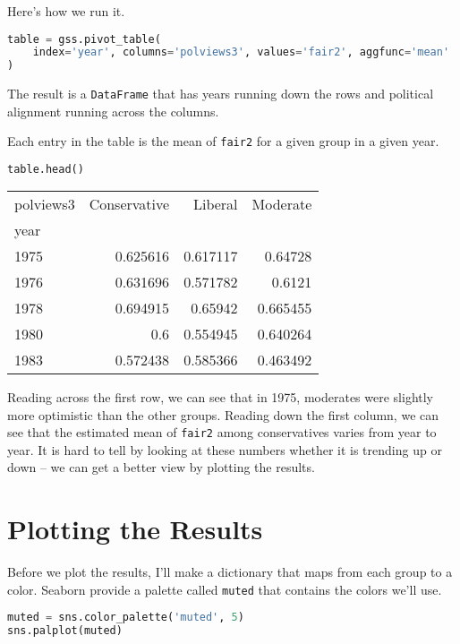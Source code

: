 Here's how we run it.

\begin{lstlisting}[language=Python,style=source]
table = gss.pivot_table(
    index='year', columns='polviews3', values='fair2', aggfunc='mean'
)
\end{lstlisting}

The result is a \passthrough{\lstinline!DataFrame!} that has years
running down the rows and political alignment running across the
columns.

\pagebreak

Each entry in the table is the mean of
\passthrough{\lstinline!fair2!} for a given group in a given year.

\begin{lstlisting}[language=Python,style=source]
table.head()
\end{lstlisting}

\begin{tabular}{lrrr}
\toprule
polviews3 & Conservative & Liberal & Moderate \\
year &  &  &  \\
\midrule
1975 & 0.625616 & 0.617117 & 0.64728 \\
1976 & 0.631696 & 0.571782 & 0.6121 \\
1978 & 0.694915 & 0.65942 & 0.665455 \\
1980 & 0.6 & 0.554945 & 0.640264 \\
1983 & 0.572438 & 0.585366 & 0.463492 \\
\bottomrule
\end{tabular}

Reading across the first row, we can see that in 1975, moderates were
slightly more optimistic than the other groups. Reading down the first
column, we can see that the estimated mean of
\passthrough{\lstinline!fair2!} among conservatives varies from year to
year. It is hard to tell by looking at these numbers whether it is
trending up or down -- we can get a better view by plotting the results.

\section{Plotting the Results}\label{plotting-the-results}

Before we plot the results, I'll make a dictionary that maps from each
group to a color. Seaborn provide a palette called
\passthrough{\lstinline!muted!} that contains the colors we'll use.

\begin{lstlisting}[language=Python,style=source]
muted = sns.color_palette('muted', 5)
sns.palplot(muted)
\end{lstlisting}

